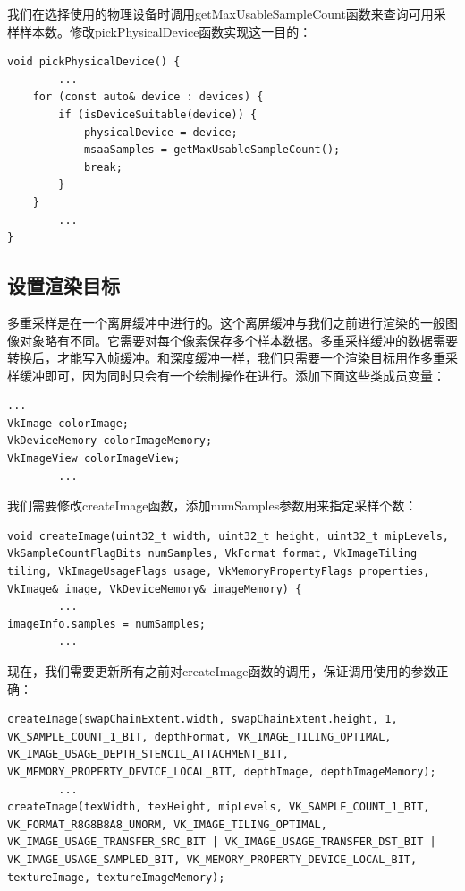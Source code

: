 \documentclass{ctexart}
\begin{document}
我们在选择使用的物理设备时调用getMaxUsableSampleCount函数来查询可用采样样本数。修改pickPhysicalDevice函数实现这一目的：

\begin{lstlisting}[language={[ANSI]C}]
void pickPhysicalDevice() {
		...
	for (const auto& device : devices) {
		if (isDeviceSuitable(device)) {
			physicalDevice = device;
			msaaSamples = getMaxUsableSampleCount();
			break;
		}
	}
		...
}
\end{lstlisting}

\subsection{设置渲染目标}

多重采样是在一个离屏缓冲中进行的。这个离屏缓冲与我们之前进行渲染的一般图像对象略有不同。它需要对每个像素保存多个样本数据。多重采样缓冲的数据需要转换后，才能写入帧缓冲。和深度缓冲一样，我们只需要一个渲染目标用作多重采样缓冲即可，因为同时只会有一个绘制操作在进行。添加下面这些类成员变量：

\begin{lstlisting}[language={[ANSI]C}]
		...
VkImage colorImage;
VkDeviceMemory colorImageMemory;
VkImageView colorImageView;
		...
\end{lstlisting}

我们需要修改createImage函数，添加numSamples参数用来指定采样个数：

\begin{lstlisting}[language={[ANSI]C}]
void createImage(uint32_t width, uint32_t height, uint32_t mipLevels, VkSampleCountFlagBits numSamples, VkFormat format, VkImageTiling tiling, VkImageUsageFlags usage, VkMemoryPropertyFlags properties, VkImage& image, VkDeviceMemory& imageMemory) {
		...
imageInfo.samples = numSamples;
		...
\end{lstlisting}

现在，我们需要更新所有之前对createImage函数的调用，保证调用使用的参数正确：

\begin{lstlisting}[language={[ANSI]C}]
createImage(swapChainExtent.width, swapChainExtent.height, 1, VK_SAMPLE_COUNT_1_BIT, depthFormat, VK_IMAGE_TILING_OPTIMAL, VK_IMAGE_USAGE_DEPTH_STENCIL_ATTACHMENT_BIT, VK_MEMORY_PROPERTY_DEVICE_LOCAL_BIT, depthImage, depthImageMemory);
		...
createImage(texWidth, texHeight, mipLevels, VK_SAMPLE_COUNT_1_BIT, VK_FORMAT_R8G8B8A8_UNORM, VK_IMAGE_TILING_OPTIMAL, VK_IMAGE_USAGE_TRANSFER_SRC_BIT | VK_IMAGE_USAGE_TRANSFER_DST_BIT |
VK_IMAGE_USAGE_SAMPLED_BIT, VK_MEMORY_PROPERTY_DEVICE_LOCAL_BIT, textureImage, textureImageMemory);
\end{lstlisting}
\end{document}
